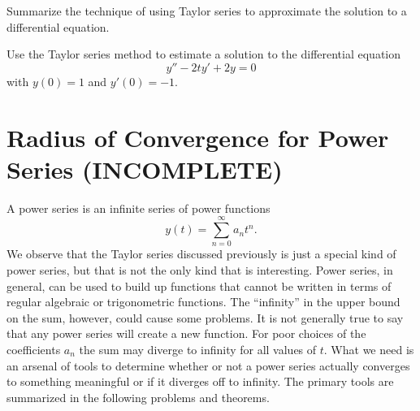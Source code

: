 \begin{problem}
    Summarize the technique of using Taylor series to approximate the solution to a
    differential equation.
\end{problem}

\begin{problem}
    Use the Taylor series method to estimate a solution to the differential equation
    \[ y'' - 2ty' + 2y = 0 \]
    with $y(0) = 1$ and $y'(0)=-1$.
\end{problem}



\section{Radius of Convergence for Power Series (INCOMPLETE)}
A power series is an infinite series of power functions
\[ y(t) = \sum_{n=0}^\infty a_n t^n. \]
We observe that the Taylor series discussed previously is just a special kind of power
series, but that is not the only kind that is interesting.  Power series, in general, can
be used to build up functions that cannot be written in terms of regular algebraic or
trigonometric functions.  The ``infinity'' in the upper bound on the sum, however, could
cause some problems.  It is not generally true to say that any power series will create a
new function.  For poor choices of the coefficients $a_n$ the sum may diverge to infinity
for all values of $t$.  What we need is an arsenal of tools to determine whether or not a
power series actually converges to something meaningful or if it diverges off to infinity.
The primary tools are summarized in the following problems and theorems.


